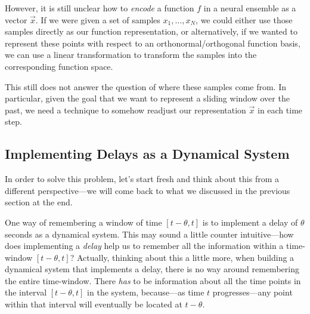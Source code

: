 \documentclass[10pt,letterpaper,oneside]{article}
\begin{document}
However, it is still unclear how to \emph{encode} a function $f$ in a neural ensemble as a vector $\vec x$. If we were given a set of samples $x_1, \ldots, x_N$, we could either use those samples directly as our function representation, or alternatively, if we wanted to represent these points with respect to an orthonormal/orthogonal function basis, we can use a linear transformation to transform the samples into the corresponding function space.

This still does not answer the question of where these samples come from. In particular, given the goal that we want to represent a sliding window over the past, we need a technique to somehow readjust our representation $\vec x$ in each time step.

\subsection{Implementing Delays as a Dynamical System}

In order to solve this problem, let's start fresh and think about this from a different perspective---we will come back to what we discussed in the previous section at the end. 

One way of remembering a window of time $[t - \theta, t]$ is to implement a delay of $\theta$ seconds as a dynamical system. This may sound a little counter intuitive---how does implementing a \emph{delay} help us to remember all the information within a time-window $[t - \theta, t]$? Actually, thinking about this a little more, when building a dynamical system that implements a delay, there is no way around remembering the entire time-window. There \emph{has} to be information about all the time points in the interval $[t - \theta, t]$ in the system, because---as time $t$ progresses---any point within that interval will eventually be located at $t - \theta$.
\end{document}
